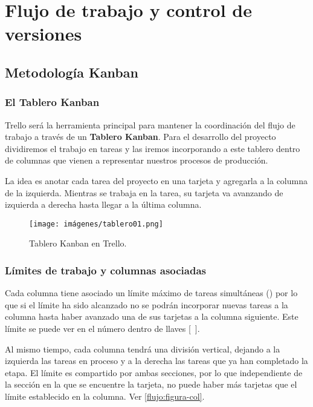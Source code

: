 
\section{Flujo de trabajo y control de versiones}\label{flujo:flujo-de-trabajo}

\subsection{Metodología Kanban}\label{flujo:metodologia-kanban}
\subsubsection{El Tablero Kanban}\label{flujo:tablero-kanban}
Trello será la herramienta principal para mantener la coordinación del flujo de trabajo a través de un \textbf{Tablero Kanban}. Para el desarrollo del proyecto dividiremos el trabajo en tareas y las iremos incorporando a este tablero dentro de columnas que vienen a representar nuestros procesos de producción.

La idea es anotar cada tarea del proyecto en una tarjeta y agregarla a la columna de la izquierda. Mientras se trabaja en la tarea, su tarjeta va avanzando de izquierda a derecha hasta llegar a la última columna.  

\begin{figure}[h]
	\centering
	\texttt{[image: imágenes/tablero01.png]}
	\caption{Tablero Kanban en Trello.}
\end{figure}

\subsubsection{Límites de trabajo y columnas asociadas}\label{flujo:limites-de-trabajo}
Cada columna tiene asociado un límite máximo de tareas simultáneas () por lo que si el límite ha sido alcanzado no se podrán incorporar nuevas tareas a la columna hasta haber avanzado una de sus tarjetas a la columna siguiente. Este límite se puede ver en el número dentro de llaves [~].

Al mismo tiempo, cada columna tendrá una división vertical, dejando a la izquierda las tareas en proceso y a la derecha las tareas que ya han completado la etapa. El límite es compartido por ambas secciones, por lo que independiente de la sección en la que se encuentre la tarjeta, no puede haber más tarjetas que el límite establecido en la columna. Ver \autoref{flujo:figura-col}.

